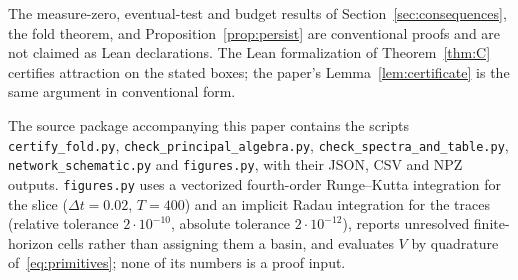 \documentclass[11pt,a4paper]{article}
\theoremstyle{plain}
\theoremstyle{definition}
\theoremstyle{remark}
\begin{document}
The measure-zero, eventual-test and budget results of Section~\ref{sec:consequences}, the fold theorem, and Proposition~\ref{prop:persist} are conventional proofs and are not claimed as Lean declarations. The Lean formalization of Theorem~\ref{thm:C} certifies attraction on the stated boxes; the paper's Lemma~\ref{lem:certificate} is the same argument in conventional form.

The source package accompanying this paper contains the scripts \texttt{certify\_fold.py}, \texttt{check\_principal\_algebra.py}, \texttt{check\_spectra\_and\_table.py}, \texttt{network\_schematic.py} and \texttt{figures.py}, with their JSON, CSV and NPZ outputs. \texttt{figures.py} uses a vectorized fourth-order Runge--Kutta integration for the slice ($\Delta t=0.02$, $T=400$) and an implicit Radau integration for the traces (relative tolerance $2\cdot10^{-10}$, absolute tolerance $2\cdot10^{-12}$), reports unresolved finite-horizon cells rather than assigning them a basin, and evaluates $V$ by quadrature of~\eqref{eq:primitives}; none of its numbers is a proof input.



\end{document}
